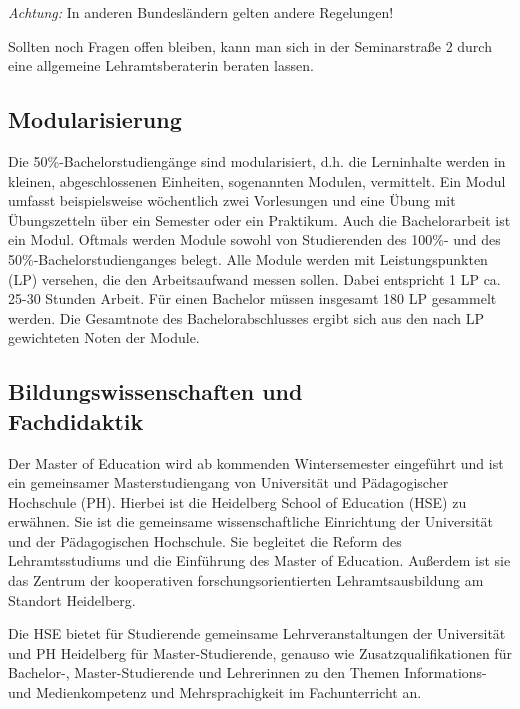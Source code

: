 \emph{Achtung:} In anderen Bundesländern gelten andere Regelungen!

Sollten noch Fragen offen bleiben, kann man sich in der Seminarstraße 2 durch eine allgemeine Lehramtsberaterin beraten lassen. 



\subsection{Modularisierung}
Die 50\%-Bachelorstudiengänge sind modularisiert, d.h. die Lerninhalte werden in kleinen, abgeschlossenen Einheiten, sogenannten Modulen, vermittelt. Ein Modul umfasst beispielsweise wöchentlich zwei Vorlesungen und eine Übung mit Übungszetteln über ein Semester oder ein Praktikum. Auch die Bachelorarbeit ist ein Modul. Oftmals werden Module sowohl von Studierenden des 100\%- und des 50\%-Bachelorstudienganges belegt. Alle Module werden mit Leistungspunkten (\gls{LP}) versehen, die den Arbeitsaufwand messen sollen. Dabei entspricht 1 \gls{LP} ca. 25-30 Stunden Arbeit. Für einen Bachelor müssen insgesamt 180 \gls{LP} gesammelt werden. Die Gesamtnote des Bachelorabschlusses ergibt sich aus den nach \gls{LP} gewichteten Noten der Module.

\subsection{Bildungswissenschaften und \\Fachdidaktik}
Der Master of Education wird ab kommenden Wintersemester eingeführt und ist ein gemeinsamer Masterstudiengang von Universität und Pädagogischer Hochschule (PH). Hierbei ist die Heidelberg School of  Education (HSE) zu erwähnen. Sie ist die gemeinsame wissenschaftliche Einrichtung der Universität und der Pädagogischen Hochschule. Sie begleitet die Reform des Lehramtsstudiums und die Einführung des Master of Education. Außerdem ist sie das Zentrum der kooperativen forschungsorientierten Lehramtsausbildung am Standort Heidelberg. 

Die HSE bietet für Studierende gemeinsame Lehrveranstaltungen der Universität und PH Heidelberg für Master-Studierende, genauso wie Zusatzqualifikationen für Bachelor-, Master-Studierende und Lehrerinnen zu den Themen Informations- und Medienkompetenz und Mehrsprachigkeit im Fachunterricht an. 


